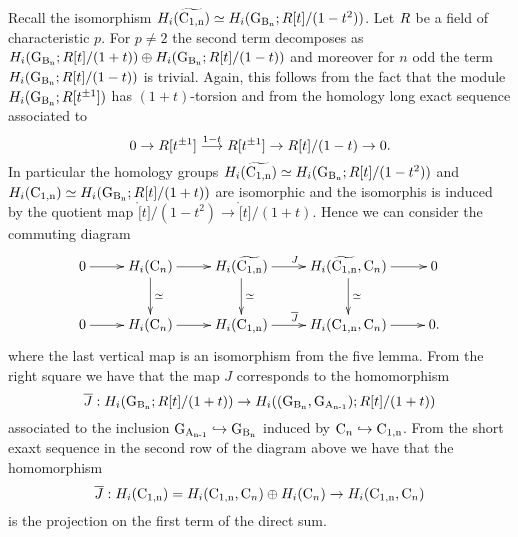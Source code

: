 \begin{rem} \label{rem:J}
Recall the isomorphism $H_i(\widetilde{\operatorname{C_{1,n}}}) \simeq H_i(\operatorname{G_{B_{n}}}; R[t]/(1-t^2))$. Let $R$ be a field of characteristic $p$. For $p \neq 2$ the second term decomposes as $H_i(\operatorname{G_{B_{n}}}; R[t]/(1+t)) \oplus H_i(\operatorname{G_{B_{n}}}; R[t]/(1-t)) $ and moreover for $n$ odd  the term $H_i(\operatorname{G_{B_{n}}}; R[t]/(1-t))$ is trivial. Again, this follows from the fact that the module $H_i(\operatorname{G_{B_{n}}}; R[t^{\pm 1}])$ has $(1+t)$-torsion and from the homology long exact sequence associated to
	$$
	0 \to R[t^{\pm 1}] \stackrel{1-t}{\longrightarrow} R[t^{\pm 1} ] \to R[t]/(1-t) \to 0.
	$$
	In particular the homology groups $H_i(\widetilde{\operatorname{C_{1,n}}}) \simeq H_i(\operatorname{G_{B_{n}}}; R[t]/(1-t^2))$ and $H_i(\operatorname{C_{1,n}}) \simeq H_i(\operatorname{G_{B_{n}}}; R[t]/(1+t))$ are isomorphic and the isomorphis is induced by the quotient map $\ring[t]/(1-t^2) \to \ring[t]/(1+t)$.
	Hence 
	we can consider the commuting diagram
	$$
	\begin{tabular}{c}
	\xymatrix @R=2pc @C=2pc {
		0 \ar[r]& H_i(\conf_n) \ar[d]^\simeq \ar[r] & H_i(\confmd{n})	\ar[d]^\simeq \ar[r]^J & H_i(\confmd{n}, \conf_n) \ar[d]^\simeq  \ar[r] & 0\\
		0 \ar[r] & H_i(\conf_n) \ar[r] & H_i(\confm{n}) \ar[r]^{\overline{J}} & H_i(\confm{n}, \conf_n) \ar[r] & 0.
	}
	\end{tabular}
	$$
	where the last vertical map is an isomorphism from the five lemma. 
	From the right square we have that the map $J$ corresponds to the homomorphism
	$$
\overline{J}:	H_i(\operatorname{G_{B_{n}}}; R[t]/(1+t)) \to H_i((\operatorname{G_{B_{n}}}, \operatorname{G_{A_{n-1}}}); R[t]/(1+t))
	$$
	associated to the inclusion $\operatorname{G_{A_{n-1}}} \hookrightarrow \operatorname{G_{B_{n}}}$ induced by $\operatorname{C}_n \hookrightarrow \operatorname{C_{1,n}}$.  From the short exaxt sequence in the second row of the diagram above we have that the homomorphism $$\overline{J}: H_i(\operatorname{C_{1,n}}) = H_i(\operatorname{C_{1,n}}, \operatorname{C}_n) \oplus H_i(\operatorname{C}_n) \to H_i(\operatorname{C_{1,n}}, \operatorname{C}_n)$$ is the projection on the first term of the direct sum.
\end{rem}

